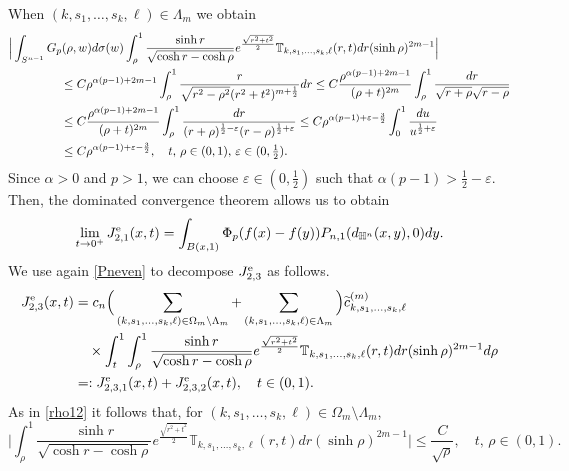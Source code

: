 \documentclass[a4paper,10pt, reqno]{amsart}
\theoremstyle{definition}
\theoremstyle{remark}
\numberwithin{equation}{section}
\begin{document}
{\begin{equation}
\end{equation}
When $(k,s_1,\ldots,s_k,\ell)\in \Lambda _m$ we obtain
\begin{align*}
    \Big|\int_{S^{n-1}}G_p(\rho , w)d\sigma(w)\int_\rho ^1\frac{\sinh r}{\sqrt{\cosh r -\cosh \rho}}e^{\frac{\sqrt{r^2+t^2}}{2}}\mathbb T_{k,s_1,\ldots,s_k,\ell}(r, t)dr(\sinh \rho )^{2m-1}\Big|&\\
    &\hspace{-11cm}\leq C\rho^{\alpha (p-1)+2m-1}\int_\rho ^1\frac{r}{\sqrt{r^2-\rho ^2}(r^2+t^2)^{m+\frac{1}{2}}}dr\leq C\frac{\rho ^{\alpha (p-1)+2m-1}}{(\rho +t)^{2m}}\int_\rho ^1\frac{dr}{\sqrt{r+\rho}\sqrt{r-\rho}}\\
    &\hspace{-11cm}\leq C\frac{\rho ^{\alpha (p-1)+2m-1}}{(\rho +t)^{2m}}\int_\rho ^1\frac{dr}{(r+\rho)^{\frac{1}{2}-\varepsilon}(r-\rho)^{\frac{1}{2}+\varepsilon}}\leq C\rho^{\alpha(p-1)+\varepsilon-\frac{3}{2}}\int_0^1\frac{du}{u^{\frac{1}
    {2}+\varepsilon}}\\
    &\hspace{-11cm}\leq C\rho^{\alpha (p-1)+\varepsilon-\frac{3}{2}},\quad t,\,\rho \in (0,1), \,\varepsilon \in (0,\tfrac{1}{2}).
\end{align*}
Since $\alpha>0$ and $p>1$, we can choose $\varepsilon \in (0,\tfrac{1}{2})$ such that $\alpha(p-1)>\tfrac{1}{2}-\varepsilon$. Then, the dominated convergence theorem allows us to obtain
\begin{equation}\label{J21even}
    \lim_{t\rightarrow 0^+}J_{2,1}^{\rm e}(x,t)=\int_{B(x,1)}\Phi _p(f(x)-f(y))P_{n,1}(d_{\mathbb H^n}(x,y),0)dy.
\end{equation}
We use again \eqref{Pneven} to decompose $J_{2,3}^{\rm e}$ as follows. 
\begin{align}\label{J23decom}
J_{2,3}^{\rm e}(x,t)&=c_n\Big(\sum_{(k,s_1,\ldots,s_k,\ell)\in \Omega_m\setminus \Lambda _m}+\sum_{(k,s_1,\ldots, s_k,\ell)\in \Lambda _m}\Big)\widetilde{c}_{k,s_1,\ldots, s_k,\ell}^{(m)}\nonumber\\
&\quad \times\int_t^1\int_\rho ^1\frac{\sinh r}{\sqrt{\cosh r -\cosh \rho}}e^{\frac{\sqrt{r^2+t^2}}{2}}\mathbb T_{k,s_1,\ldots,s_k,\ell}(r, t)dr(\sinh \rho )^{2m-1}d\rho\nonumber\\
&=:J_{2,3,1}^{\rm e}(x,t)+J_{2,3,2}^{\rm e}(x,t),\quad t\in (0,1).
\end{align}
As in \eqref{rho12} it follows that, for $(k,s_1,\ldots, s_k,\ell)\in \Omega_m \setminus \Lambda _m$,
$$
\Big|\int_\rho ^1\frac{\sinh r}{\sqrt{\cosh r -\cosh \rho}}e^{\frac{\sqrt{r^2+t^2}}{2}}\mathbb T_{k,s_1,\ldots,s_k,\ell}(r, t)dr(\sinh \rho )^{2m-1}\Big|\leq \frac{C}{\sqrt{\rho}},\quad t,\,\rho \in (0,1).
$$}
\end{document}
